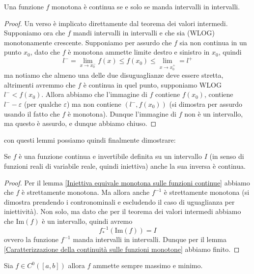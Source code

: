 \documentclass[11pt]{scrartcl}
\begin{document}
	\begin{lemma}\label{Caratterizzazione della continuità sulle funzioni monotone}
		Una funzione $f$ monotona è continua se e solo se manda intervalli in intervalli. 
	\end{lemma}
	\begin{proof}
		Un verso è implicato direttamente dal teorema dei valori intermedi. Supponiamo ora che $f$ mandi intervalli in intervalli e che sia (WLOG) monotonamente crescente. Supponiamo per assurdo che $f$ sia non continua in un punto $x_0$, dato che $f$ è monotona ammette limite destro e sinistro in $x_0$, quindi 
		$$l^-=\lim_{x\to x_0^-}f(x)\le f(x_0)\le \lim_{x\to x_0^+}=l^+$$
		ma notiamo che almeno una delle due disuguaglianze deve essere stretta, altrimenti avremmo che $f$ è continua in quel punto, supponiamo WLOG $l^-<f(x_0)$. Allora abbiamo che l'immagine di $f$ contiene $f(x_0)$, contiene $l^--\varepsilon$ (per qualche $\varepsilon$) ma non contiene $(l^-,f(x_0))$ (si dimostra per assurdo usando il fatto che $f$ è monotona). Dunque l'immagine di $f$ non è un intervallo, ma questo è assurdo, e dunque abbiamo chiuso.
	\end{proof}
	con questi lemmi possiamo quindi finalmente dimostrare:
	\begin{theorem}
		Se $f$ è una funzione continua e invertibile definita su un intervallo $I$ (in senso di funzioni reali di variabile reale, quindi iniettiva) anche la sua inversa è continua.
	\end{theorem}
	\begin{proof}
		Per il lemma \ref{Iniettiva equivale monotona sulle funzioni continue} abbiamo che $f$ è strettamente monotona. Ma allora anche $f^{-1}$ è strettamente monotona (si dimostra prendendo i contronominali e escludendo il caso di uguaglianza per iniettività). Non solo, ma dato che per il teorema dei valori intermedi abbiamo che $\text{Im}(f)$ è un intervallo, quindi avremo 
		$$f_*^{-1}(\text{Im}(f))=I$$
		ovvero la funzione $f^{-1}$ manda intervalli in intervalli. Dunque per il lemma \ref{Caratterizzazione della continuità sulle funzioni monotone} abbiamo finito.
	\end{proof}
	\begin{theorem}[Weierstrass]
		Sia $f\in C^0([a,b])$ allora $f$ ammette sempre massimo e minimo.
	\end{theorem}
\end{document}
